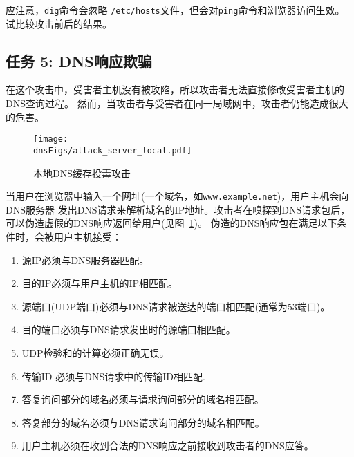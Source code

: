 应注意，{\tt dig}命令会忽略 \texttt{/etc/hosts}文件，但会对\texttt{ping}命令和浏览器访问生效。
试比较攻击前后的结果。



\subsection{任务 5: DNS响应欺骗}


在这个攻击中，受害者主机没有被攻陷，所以攻击者无法直接修改受害者主机的DNS查询过程。
然而，当攻击者与受害者在同一局域网中，攻击者仍能造成很大的危害。


\begin{figure}[htb]
\centering
\texttt{[image: \\dnsFigs/attack\_server\_local.pdf]}
\caption{本地DNS缓存投毒攻击}
\label{dns:fig:local_attack}
\end{figure}


当用户在浏览器中输入一个网址(一个域名，如{\tt www.example.net})，用户主机会向DNS服务器
发出DNS请求来解析域名的IP地址。攻击者在嗅探到DNS请求包后，可以伪造虚假的DNS响应返回给用户(见图~\ref{dns:fig:local_attack})。
伪造的DNS响应包在满足以下条件时，会被用户主机接受：


\begin{enumerate}

\item 源IP必须与DNS服务器匹配。

\item 目的IP必须与用户主机的IP相匹配。

\item 源端口(UDP端口)必须与DNS请求被送达的端口相匹配(通常为53端口)。

\item 目的端口必须与DNS请求发出时的源端口相匹配。

\item UDP检验和的计算必须正确无误。 

\item 传输ID 必须与DNS请求中的传输ID相匹配.

\item 答复询问部分的域名必须与请求询问部分的域名相匹配。

\item 答复部分的域名必须与DNS请求询问部分的域名相匹配。

\item 用户主机必须在收到合法的DNS响应之前接收到攻击者的DNS应答。
\end{enumerate}


